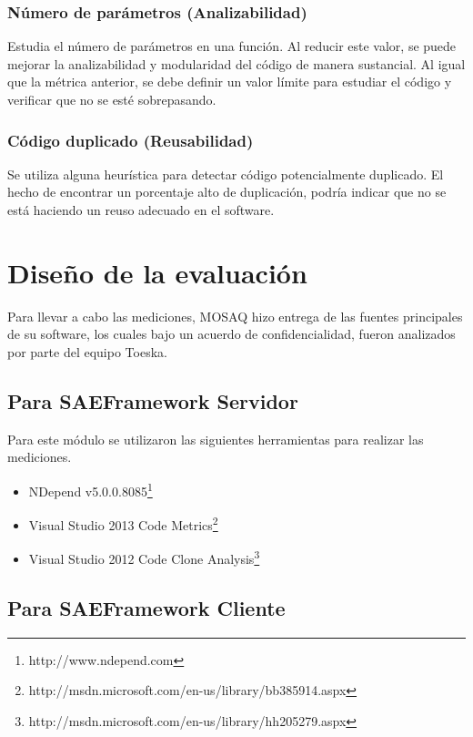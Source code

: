 \subsubsection{Número de parámetros (Analizabilidad)}
Estudia el número de parámetros en una función.
Al reducir este valor, se puede mejorar la analizabilidad y modularidad del código de manera sustancial.
Al igual que la métrica anterior, se debe definir un valor límite para estudiar el código y verificar que
no se esté sobrepasando.

\subsubsection{Código duplicado (Reusabilidad)}

Se utiliza alguna heurística para detectar código potencialmente duplicado.
El hecho de encontrar un porcentaje alto de duplicación, podría indicar que no se está haciendo un reuso 
adecuado en el software.

\section{Diseño de la evaluación}
Para llevar a cabo las mediciones, MOSAQ hizo entrega de las fuentes principales de su software, 
los cuales bajo un acuerdo de confidencialidad, fueron analizados por parte del equipo Toeska.

\subsection{Para SAEFramework Servidor}
Para este módulo se utilizaron las siguientes herramientas para realizar las mediciones.

\begin{itemize}
\item NDepend v5.0.0.8085\footnote{http://www.ndepend.com}
\item Visual Studio 2013 Code Metrics\footnote{http://msdn.microsoft.com/en-us/library/bb385914.aspx}
\item Visual Studio 2012 Code Clone Analysis\footnote{http://msdn.microsoft.com/en-us/library/hh205279.aspx}
\end{itemize}

\subsection{Para SAEFramework Cliente}

